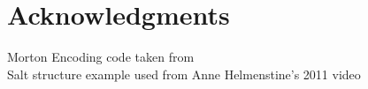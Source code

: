 \documentclass[fleqn,10pt]{UserGuideArx} %
\begin{document}
\section*{Acknowledgments} %
Morton Encoding code taken from \cite{Karras:2012}\\
Salt structure example used from Anne Helmenstine's 2011 video \cite{Helmenstine:2011}



\end{document}
